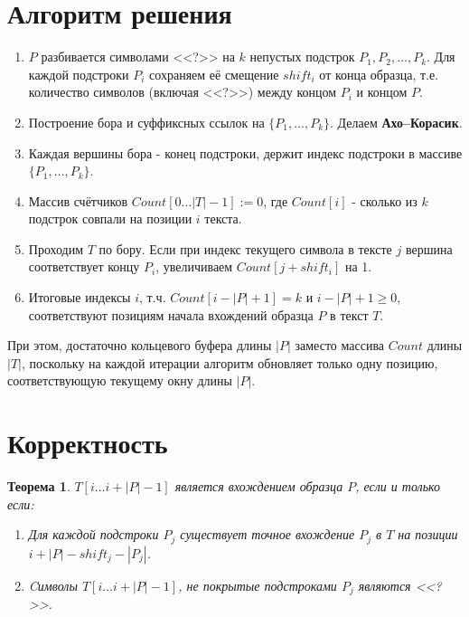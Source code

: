 \documentclass{article}
\newtheorem{theorem}{Теорема}  %
\renewcommand{\geq}{\geqslant}  %
\begin{document}
\section{Алгоритм решения}

\begin{enumerate}
    \item $P$ разбивается символами <<?>> на $k$ непустых подстрок $P_1, P_2, \ldots, P_k$. Для каждой подстроки $P_i$ сохраняем её смещение $shift_i$ от конца образца, т.е. количество символов (включая <<?>>) между концом $P_i$ и концом $P$.

    \item Построение бора и суффиксных ссылок на $\{P_1, \ldots, P_k\}$. Делаем \textbf{Ахо–Корасик}.

    \item Каждая вершины бора - конец подстроки, держит индекс подстроки в массиве $\{P_1, \ldots, P_k\}$.

    \item Массив счётчиков $Count[0 \ldots |T| - 1] := 0$, где $Count[i]$ - сколько из $k$ подстрок совпали на позиции $i$ текста.

    \item Проходим $T$ по бору. Если при индекс текущего символа в тексте $j$ вершина соответствует концу $P_i$, увеличиваем $Count[j + shift_i]$ на 1.

    \item Итоговые индексы $i$, т.ч. $Count[i - |P| + 1] = k$ и $i - |P| + 1 \geq 0$, соответствуют позициям начала вхождений образца $P$ в текст $T$.
\end{enumerate}

При этом, достаточно кольцевого буфера длины $|P|$ заместо массива $Count$ длины $|T|$, поскольку на каждой итерации алгоритм обновляет только одну позицию, соответствующую текущему окну длины $|P|$.

\section{Корректность}

\begin{theorem}
    $T[i \ldots i + |P| - 1]$ является вхождением образца $P$, если и только если:

    \begin{enumerate}
        \item Для каждой подстроки $P_j$ существует точное вхождение $P_j$ в $T$ на позиции $i + |P| - shift_j - |P_j|$.

        \item Cимволы $T[i \ldots i + |P| - 1]$, не покрытые подстроками $P_j$ являются
              <<?>>.
    \end{enumerate}
\end{theorem}
\end{document}
